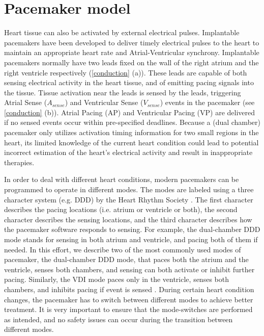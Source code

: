 \section{Pacemaker model}
\label{pacemakerModel}

Heart tissue can also be activated by external electrical pulses. 
\textsf{Implantable pacemakers} have been developed to deliver timely electrical pulses to the heart to maintain an appropriate heart rate and Atrial-Ventricular synchrony. 
Implantable pacemakers normally have two leads fixed on the wall of the right atrium and the right ventricle respectively (\ref{conduction} (a)). 
These leads are capable of both sensing electrical activity in the heart tissue, and of emitting pacing signals into the tissue. 
Tissue activation near the leads is sensed by the leads, triggering Atrial Sense ($A_{sense}$) and Ventricular Sense ($V_{sense}$) events in the pacemaker (see \ref{conduction} (b)). 
Atrial Pacing (AP) and Ventricular Pacing (VP) are delivered if no sensed events occur within pre-specified deadlines. Because a (dual chamber) pacemaker only utilizes activation timing information for two small regions in the heart, its limited knowledge of the current heart condition could lead to potential incorrect estimation of the heart's electrical activity and result in inappropriate therapies.

In order to deal with different heart conditions, modern pacemakers can be programmed to operate in different modes. The modes are labeled using a three character system (e.g. DDD) by the Heart Rhythm Society \cite{fogoros}. The first character describes the pacing locations (i.e. atrium or ventricle or both), the second character describes the sensing locations, and the third character describes how the pacemaker software responds to sensing. For example, the dual-chamber DDD mode stands for sensing in both atrium and ventricle, and pacing both of them if needed. In this effort, we describe two of the most commonly used modes of pacemaker, the dual-chamber DDD mode, that paces both the atrium and the ventricle, senses both chambers, and sensing can both activate or inhibit further pacing. Similarly, the VDI mode paces only in the ventricle, senses both chambers, and inhibits pacing if event is sensed \cite{pacemaker}. During certain heart condition changes, the pacemaker has to switch between different modes to achieve better treatment. It is very important to ensure that the mode-switches are performed as intended, and no safety issues can occur during the transition between different modes.

